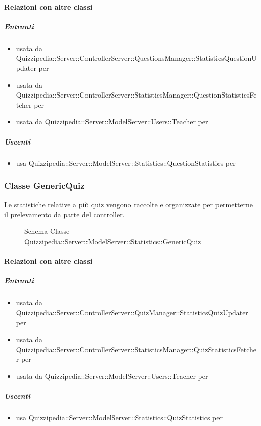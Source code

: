 \paragraph{Relazioni con altre classi}
\subparagraph{Entranti}
\begin{itemize}
\item usata da Quizzipedia::Server::ControllerServer::QuestionsManager::StatisticsQuestionUpdater per 
\item usata da Quizzipedia::Server::ControllerServer::StatisticsManager::QuestionStatisticsFetcher per 
\item usata da Quizzipedia::Server::ModelServer::Users::Teacher per 
\end{itemize}
\subparagraph{Uscenti}
\begin{itemize}
\item usa Quizzipedia::Server::ModelServer::Statistics::QuestionStatistics per 
\end{itemize}
\subsubsection{Classe GenericQuiz}
Le statistiche relative a più quiz vengono raccolte e organizzate per permetterne il prelevamento da parte del controller.
\begin{figure}[H]
\centering
\noindent{}
\caption[Schema Classe GenericQuiz]{Schema Classe Quizzipedia::Server::ModelServer::Statistics::GenericQuiz}
\end{figure}
\paragraph{Relazioni con altre classi}
\subparagraph{Entranti}
\begin{itemize}
\item usata da Quizzipedia::Server::ControllerServer::QuizManager::StatisticsQuizUpdater per 
\item usata da Quizzipedia::Server::ControllerServer::StatisticsManager::QuizStatisticsFetcher per 
\item usata da Quizzipedia::Server::ModelServer::Users::Teacher per 
\end{itemize}
\subparagraph{Uscenti}
\begin{itemize}
\item usa Quizzipedia::Server::ModelServer::Statistics::QuizStatistics per 
\end{itemize}
